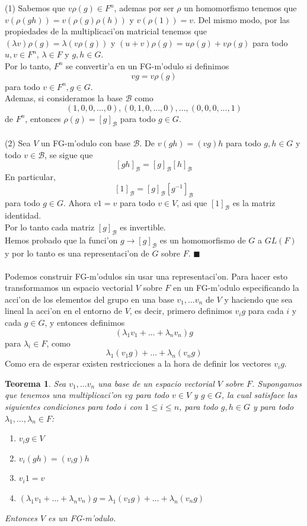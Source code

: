 \documentclass[a4paper,openright,12pt]{book}
\numberwithin{equation}{section} %
\newtheorem{teorema}{Teorema}[section] %
\newenvironment{proof}{\noindent{\it Demostracion:}}{\hfill$\blacksquare$} %
\begin{document}
\begin{proof}
(1) Sabemos que $v \rho (g) \in F^{n}$, ademas por ser $\rho$ un homomorfismo tenemos que $v (\rho (gh))=v(\rho (g) \rho (h))$ y $v (\rho (1))=v$. Del mismo modo, por las propiedades de la multiplicaci'on matricial tenemos que $(\lambda v)\rho(g)=\lambda (v \rho(g))$ y $(u +v)\rho (g)=u \rho(g) + v \rho (g)$ para todo $u, v \in F^{n}$, $\lambda \in F$ y $g, h \in G$.\\
Por lo tanto, $F^{n}$ se convertir'a en un FG-m'odulo si definimos
\[
vg=v \rho (g)
\]
para todo $v \in F^{n}, g \in G$.\\
Ademas, si consideramos la base $\mathscr{B}$ como
\[
(1, 0, 0, ..., 0), (0, 1, 0, ...,0), ..., (0, 0, 0, ... , 1)
\]
de $F^{n}$, entonces $\rho (g) = [g]_{\mathscr{B}}$ para todo $g \in G$.\\
\\
(2) Sea $V$ un FG-m'odulo con base $\mathscr{B}$. De $v(gh)=(vg)h$ para todo $g, h \in G$ y todo $v \in \mathscr{B}$, se sigue que 
\[
[gh]_{\mathscr{B}}=[g]_{\mathscr{B}}[h]_{\mathscr{B}}
\]
En particular, 
\[
[1]_{\mathscr{B}}=[g]_{\mathscr{B}}[g^{-1}]_{\mathscr{B}}
\]
para todo $g \in G$. Ahora $v1=v$ para todo $v \in V$, asi que $[1]_{\mathscr{B}}$ es la matriz identidad.\\
Por lo tanto cada matriz $[g]_{\mathscr{B}}$ es invertible.\\
Hemos probado que la funci'on $g \rightarrow [g]_{\mathscr{B}}$ es un homomorfismo de $G$ a $GL(F)$ y por lo tanto es una representaci'on de $G$ sobre $F$. 
\end{proof}\\
\\
Podemos construir FG-m'odulos sin usar una representaci'on. Para hacer esto transformamos un espacio vectorial $V$ sobre $F$ en un FG-m'odulo especificando la acci'on de los elementos del grupo en una base $v_{1}, \ldots v_{n}$ de $V$ y haciendo que sea lineal la acci'on en el entorno de $V$, es decir, primero definimos $v_{i}g$ para cada $i$ y cada $g \in G$, y entonces definimos
\[
(\lambda_{1}v_{1}+ \ldots +\lambda_{n}v_{n})g
\]
para $\lambda_{i} \in F$, como 
\[
\lambda_{1}(v_{1}g)+ \ldots +\lambda_{n}(v_{n}g)
\]
Como era de esperar existen restricciones a la hora de definir los vectores $v_{i}g$.
\begin{teorema}
Sea $v_{1}, \ldots v_{n}$ una base de un espacio vectorial $V$ sobre $F$. Supongamos que tenemos una multiplicaci'on $vg$ para todo $v \in V$ y $g \in G$, la cual satisface las siguientes condiciones para todo $i$ con $1 \leq i \leq n$, para todo $g, h \in G$ y para todo $\lambda_{1}, \ldots ,\lambda_{n} \in F$:
\begin{enumerate}
\item $v_{i}g \in V$
\item $v_{i}(gh)=(v_{i}g)h$
\item $v_{i}1=v$
\item $(\lambda_{1}v_{1}+ \ldots +\lambda_{n}v_{n})g=\lambda_{1}(v_{1}g)+ \ldots +\lambda_{n}(v_{n}g)$ 
\end{enumerate}
Entonces $V$ es un FG-m'odulo.
\end{teorema}
\end{document}
